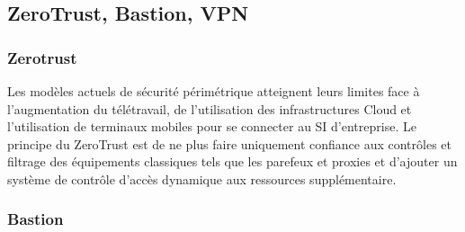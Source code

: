 \subsection{ZeroTrust, Bastion, VPN}

\subsubsection{Zerotrust}
Les modèles actuels de sécurité périmétrique atteignent leurs limites face à l'augmentation du télétravail, de l'utilisation des infrastructures Cloud et l'utilisation de terminaux mobiles pour se connecter au SI d'entreprise.
Le principe du ZeroTrust est de ne plus faire uniquement confiance aux contrôles et filtrage des équipements classiques tels que les parefeux et proxies et d'ajouter un système de contrôle d'accès dynamique aux ressources supplémentaire.




\subsubsection{Bastion}

